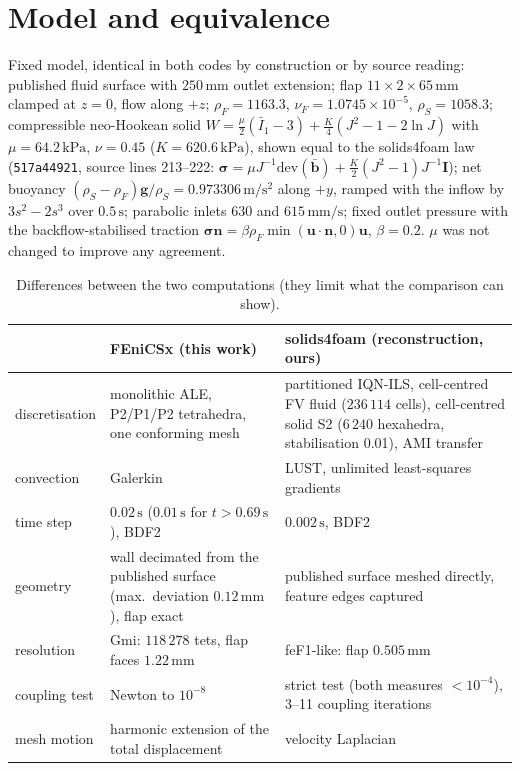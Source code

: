 \documentclass[sn-mathphys,Numbered]{sn-jnl}
\begin{document}
\section{Model and equivalence}\label{sec:model}
Fixed model, identical in both codes by construction or by source reading: published fluid surface with $250\,\mathrm{mm}$ outlet extension; flap $11\times2\times65\,\mathrm{mm}$ clamped at $z=0$, flow along $+z$; $\rho_F=1163.3$, $\nu_F=1.0745\times10^{-5}$, $\rho_S=1058.3$; compressible neo-Hookean solid $W=\tfrac{\mu}{2}(\bar I_1-3)+\tfrac{K}{4}(J^2-1-2\ln J)$ with $\mu=64.2\,\mathrm{kPa}$, $\nu=0.45$ ($K=620.6\,\mathrm{kPa}$), shown equal to the solids4foam law (\texttt{517a44921}, source lines 213--222: $\bm\sigma=\mu J^{-1}\mathrm{dev}(\bar{\bm b})+\tfrac K2 (J^2-1)J^{-1}\bm I$); net buoyancy $(\rho_S-\rho_F)\bm g/\rho_S=0.973306\,\mathrm{m/s^2}$ along $+y$, ramped with the inflow by $3s^2-2s^3$ over $0.5\,\mathrm{s}$; parabolic inlets $630$ and $615\,\mathrm{mm/s}$; fixed outlet pressure with the backflow-stabilised traction $\bm\sigma\bm n=\beta\rho_F\min(\bm u\cdot\bm n,0)\bm u$, $\beta=0.2$. $\mu$ was not changed to improve any agreement.
\begin{table}[htbp]\centering\caption{Differences between the two computations (they limit what the comparison can show).}\label{tab:diff}\small
\begin{tabular}{@{}p{2.9cm}p{5.2cm}p{5.5cm}@{}}\toprule
 & FEniCSx (this work) & solids4foam (reconstruction, ours)\\\midrule
discretisation & monolithic ALE, P2/P1/P2 tetrahedra, one conforming mesh & partitioned IQN-ILS, cell-centred FV fluid ($236\,114$ cells), cell-centred solid S2 ($6\,240$ hexahedra, stabilisation 0.01), AMI transfer\\
convection & Galerkin & LUST, unlimited least-squares gradients\\
time step & $0.02\,\mathrm{s}$ ($0.01\,\mathrm{s}$ for $t>0.69\,\mathrm{s}$), BDF2 & $0.002\,\mathrm{s}$, BDF2\\
geometry & wall decimated from the published surface (max.\ deviation $0.12\,\mathrm{mm}$), flap exact & published surface meshed directly, feature edges captured\\
resolution & Gmi: $118\,278$ tets, flap faces $1.22\,\mathrm{mm}$ & feF1-like: flap $0.505\,\mathrm{mm}$\\
coupling test & Newton to $10^{-8}$ & strict test (both measures $<10^{-4}$), 3--11 coupling iterations\\
mesh motion & harmonic extension of the total displacement & velocity Laplacian\\\bottomrule
\end{tabular}\end{table}
\end{document}
